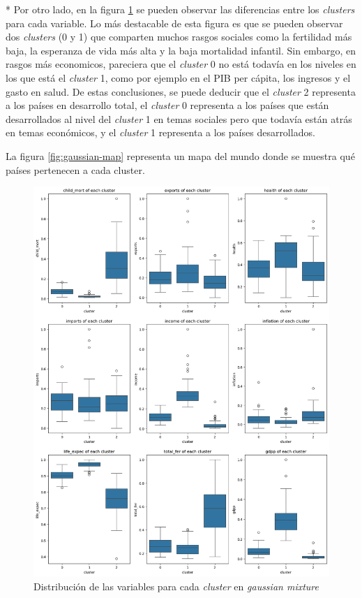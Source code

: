 \documentclass{article}
\begin{document}
\begin{paracol}{2}
  \sloppy
  \switchcolumn[0]*
  \noindent Por otro lado, en la figura \ref{fig:gaussian-features} se pueden observar las diferencias entre los \textit{clusters} para cada variable.
  Lo más destacable de esta figura es que se pueden observar dos \textit{clusters} (0 y 1) que comparten muchos rasgos sociales como la fertilidad más baja, la esperanza de vida más alta y la baja mortalidad infantil.
  Sin embargo, en rasgos más economicos, pareciera que el \textit{cluster} 0 no está todavía en los niveles en los que está el \textit{cluster} 1,
  como por ejemplo en el PIB per cápita, los ingresos y el gasto en salud.
  De estas conclusiones, se puede deducir que el \textit{cluster} 2 representa a los países en desarrollo total,
  el \textit{cluster} 0 representa a los países que están desarrollados al nivel del \textit{cluster} 1 en temas sociales pero que todavía están atrás en temas económicos,
  y el \textit{cluster} 1 representa a los países desarrollados.

  \noindent La figura \ref{fig:gaussian-map} representa un mapa del mundo donde se muestra qué países pertenecen a cada cluster.

  \switchcolumn
  \begin{figure}[H]
    \includegraphics[width=\linewidth]{../images/gaussian/features-dist.png}
    \caption{Distribución de las variables para cada \textit{cluster} en \textit{gaussian mixture}}
    \label{fig:gaussian-features}
  \end{figure}
\end{paracol}
\end{document}
